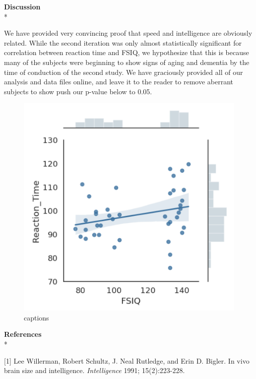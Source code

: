 \documentclass{article}
\begin{document}
\textbf{Discussion}\\*

We have provided very convincing proof that speed and intelligence are obviously related. While the second iteration was only almost statistically significant for correlation between reaction time and FSIQ, we hypothesize that this is because many of the subjects were beginning to show signs of aging and dementia by the time of conduction of the second study. We have graciously provided all of our analysis and data files online, and leave it to the reader to remove aberrant subjects to show push our p-value below to 0.05. 



\begin{figure}[h]
    \centering
    \includegraphics[scale = 0.65]{figure.png}
    \caption{\small{captions}}
\end{figure}

\textbf{References}\\*

[1] Lee Willerman, Robert Schultz, J. Neal Rutledge, and Erin D. Bigler. In vivo brain size and intelligence. \emph{Intelligence} 1991; 15(2):223-228. 
\end{document}

